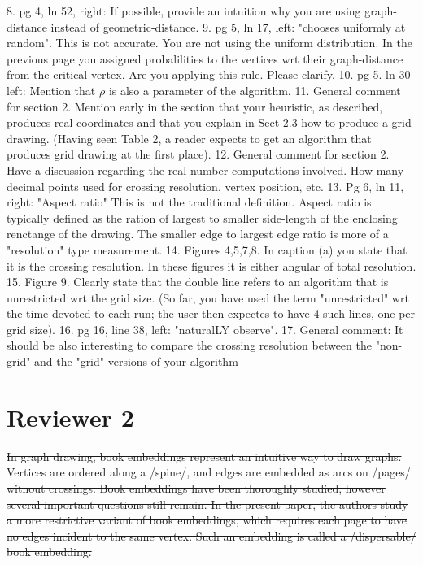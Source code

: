 \documentclass{article}
\begin{document}
\begin{itemize}
{8. pg 4, ln 52, right: If possible, provide an intuition why you are using graph-distance instead of
geometric-distance.
9. pg 5, ln 17, left: "chooses uniformly at random". This is not accurate. You are not using the
uniform distribution.
In the previous page you assigned probalilities to the vertices wrt their graph-distance from the
critical
vertex. Are you applying this rule. Please clarify.
10. pg 5. ln 30 left: Mention that $\rho$ is also a parameter of the algorithm.
11. General comment for section 2. Mention early in the section that your heuristic, as described,
produces real coordinates
and that you explain in Sect 2.3 how to produce a grid drawing. (Having seen Table 2, a reader
expects to get an algorithm that
produces grid drawing at the first place).
12. General comment for section 2. Have a discussion regarding the real-number computations
involved. How many decimal points used
for crossing resolution, vertex position, etc.
13. Pg 6, ln 11, right: "Aspect ratio" This is not the traditional definition. Aspect ratio is
typically defined as the ration of
largest to smaller side-length of the enclosing renctange of the drawing. The smaller edge to
largest edge ratio is more of a
"resolution" type measurement.
14. Figures 4,5,7,8. In caption (a) you state that it is the crossing resolution. In these figures it is
either angular of total
resolution.
15. Figure 9. Clearly state that the double line refers to an algorithm that is unrestricted wrt the
grid size. (So far, you have
used the term "unrestricted" wrt the time devoted to each run; the user then expectes to have 4
such lines, one per grid size).
16. pg 16, line 38, left: "naturalLY observe".
17. General comment: It should be also interesting to compare the crossing resolution between
the "non-grid" and the "grid"
versions of your algorithm


\newpage
\section*{Reviewer 2}

\st{In graph drawing, book embeddings represent an intuitive way to draw graphs. Vertices are ordered along a /spine/, and edges are embedded as arcs on /pages/ without crossings. Book embeddings have been thoroughly studied, however several important questions still remain. In the present paper, the authors study a more restrictive variant of book embeddings, which requires each page to have no edges incident to the same vertex. Such an embedding is called a /dispersable/ book embedding.}

}
\end{itemize}
\end{document}
